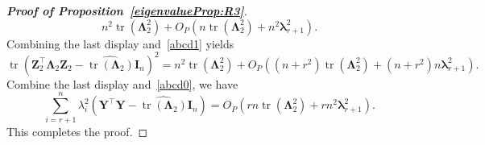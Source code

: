\documentclass[12pt]{article} %
\DeclareMathOperator{\mytr}{tr}
\newcommand{\bZ}{\mathbf{Z}}
\newcommand{\bY}{\mathbf{Y}}
\newcommand{\bI}{\mathbf{I}}
\newcommand{\bfsym}[1]{\ensuremath{\boldsymbol{#1}}}
\def\blambda {\bfsym {\lambda}}
\def\bLambda {\bfsym {\Lambda}}
\theoremstyle{definition}
\begin{document}
\begin{appendices}
\begin{proof}[\textbf{Proof of Proposition~\ref{eigenvalueProp:R3}}]
\begin{equation*}
            n^2 \mytr(\bLambda_2^2)+O_P\left( n \mytr(\bLambda_2^2)+ n^{2}\blambda_{r+1}^2\right).
    \end{equation*}
    Combining the last display and~\eqref{abcd1} yields
    \begin{equation*}
        \mytr(\bZ_2^\top\bLambda_2 \bZ_2-\widehat{\mytr(\bLambda_2)}\bI_n)^2
        =
        n^2 \mytr(\bLambda_2^2)+O_P\left( (n+r^2) \mytr(\bLambda_2^2)+ (n+r^2)n\blambda_{r+1}^2\right)
        .
    \end{equation*}
    Combine the last display and~\eqref{abcd0}, we have
    \begin{equation*}
            \sum_{i=r+1}^n \lambda_i^2\left(\bY^\top \bY-\widehat{\mytr(\bLambda_2)}\bI_n\right)
            =
            O_P\left(rn \mytr(\bLambda_2^2) + r n^2 \blambda_{r+1}^2\right).
    \end{equation*}
    This completes the proof.

\end{proof}




\end{appendices}
\end{document}
